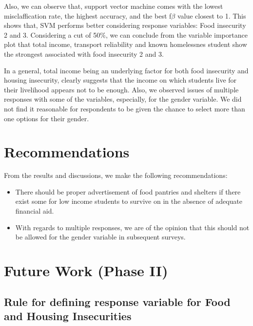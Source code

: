 \documentclass[
  10pt,
]{article}
\begin{document}
Also, we can observe that, support vector machine comes with the lowest misclaffication rate, the highest accuracy, and the best f\(\beta\) value closest to 1. This shows that, SVM performs better considering response variables: Food insecurity 2 and 3. Considering a cut of 50\%, we can conclude from the variable importance plot that total income, transport reliability and known homelessnes student show the strongest associated with food insecurity 2 and 3.

In a general, total income being an underlying factor for both food insecurity and housing insecurity, clearly suggests that the income on which students live for their livelihood appears not to be enough. Also, we observed issues of multiple responses with some of the variables, especially, for the gender variable. We did not find it reasonable for respondents to be given the chance to select more than one options for their gender.

\hypertarget{recommendations}{%
\section{Recommendations}\label{recommendations}}

From the results and discussions, we make the following recommendations:

\begin{itemize}
\item
  There should be proper advertisement of food pantries and shelters if there exist some for low income students to survive on in the absence of adequate financial aid.
\item
  With regards to multiple responses, we are of the opinion that this should not be allowed for the gender variable in subsequent surveys.
\end{itemize}

\hypertarget{future-work-phase-ii}{%
\section{Future Work (Phase II)}\label{future-work-phase-ii}}

\hypertarget{rule-for-defining-response-variable-for-food-and-housing-insecurities}{%
\subsection{Rule for defining response variable for Food and Housing Insecurities}\label{rule-for-defining-response-variable-for-food-and-housing-insecurities}}
\end{document}
